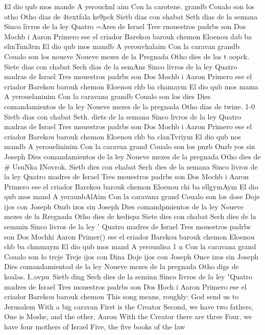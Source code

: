 El dio qub mos mande 
A yerouchnl aim 
Con la carotene. grandb 
Coualo son los otho 
Otho dias de 4textfala ke9pck 
Sietb dias con ehabat 
Seth dias de la semana 
Sinco livros de la ley 
Quatro =Ares de Israel 
Tree rnouestros padrbs son 
Dos Mochb i Aaron 
Primero ese el criador 
Barekou barouk chemon 
Eloenou dab ba elinTnn3rm 
El dio qub mos mandb 
A yerouvhalaim 
Con la caravan grandb 
Coualo son los noueve 
Noueve mezes de la Pregnada 
Otho dies de las t oopck. 
Siete dias con chabat 
Sech dias de la semAns 
Sinco livros de la ley 
Quatro madras de Israel 
Tres mouestros padrbs son 
Dos Mochb i Aaron 
Primero ese el criador 
Barekou barouk chemon 
Eloenou chb ba chamaym 
El dio qub mos mama 
A yerouelaninim 
Con la caravana grandb 
Coualo son los dies 
Dies comandamientos de la ley 
Noueve mezes de la pregnada 
Otho dias de twine. 1-0 %
Sietb dias con chabat 
Seth. diets de la semana 
Sinco livros de la ley 
Quatro madras de Israel 
Tres mouestros padrbs son 
Dos Mochb i Aaron 
Primero ese el criador 
Barekou barouk chemon 
Eloenou chb ba clanTvriym 
El dio qub nos mandb 
A yerouelininim 
Con la caravan grand 
Coualo son los pnzb 
Onzb yos sin Joseph 
Dies comandamientos de la ley 
Noueve mezes de la pregnada 
Otho dies de # UsuNka INovrok. 
Sietb dies con ehabat 
Sech dies de la semana 
Sinco livros de la ley 
Quatro madres de Israel 
Tres mouestros padrbs son 
Dos Mochb i Aaron 
Primero ese el criador 
Barekou barouk chemon 
Eloenou chi ba ellgymAym 
El dio qub mos mand 
A yeraunbAlAim 
Con la caravana grand 
Coualo son los dose 
Doje ijos con Joseph 
Onzb izos sin Joseph 
Dies comandpmientos de la ley 
Noueve mezes de la Rregnada 
Otho dies de kedispa 
Siete dies con chabat 
Sech dies de la semmin 
Sinco livros de la ley ' 
Quatro madres de Israel 
Tres mouestros padrbs son 
Dos Mochki Aaron 
Primer() ese el eriador 
Barekou barouk chemon 
Eloenou chb ba chmmaym 
El dio qub mos mand 
A yerounlisa 1 n 
Con la caravana grand 
Coualo son lo treje 
Treje ijos con Dina 
Doje ijos con Joseph 
Once izos sin Joseph 
Dies comandamientod de la ley 
Noueve mezes de la pregnada 
Otho digs de koalas. I..ovpu\ 
Sietb ding%
Sech dies de la seminn 
Sinco Iivros de la ley 
"Quatro madres de Israel 
Tres mouestros padrbs son 
Dos Hoch i Aaron 
Primero ese el criador 
Barekou barouk chemon 
This song means, roughly: 
God send us to Jerusalem 
With a big caravan 
First is the Creator 
Second, we have two fathers, 
One is Moshe, and the other, Aaron 
With the Creator there are three 
Four, we have four mothers of Israel 
Five, the five books of the law 

